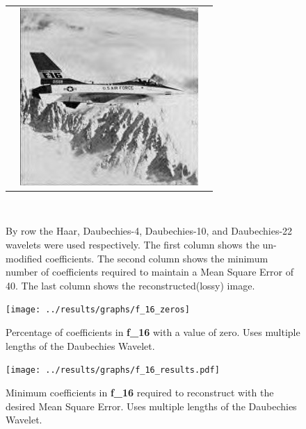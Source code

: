 \begin{figure}[hbt]
\begin{tabular}{ S @{} S @{} S }
		&	\includegraphics[height=0.25\textwidth]{../images/f_16_d22_final} \\
	\end{tabular} \\
	\caption{By row the Haar, Daubechies-4, Daubechies-10, and Daubechies-22 wavelets were used 
					 respectively. The first
					 column shows the un-modified coefficients.  The second column shows the minimum number
					 of coefficients required to maintain a Mean Square Error of 40.
					 The last column shows the reconstructed(lossy) image.}
\end{figure}


\begin{figure}[hbt]
	\centering
	\label{fig:f_16_zeros}
		\texttt{[image: ../results/graphs/f\_16\_zeros]}
	\caption{Percentage of coefficients in {\bf f\_16} with a value of zero. Uses multiple lengths of the Daubechies Wavelet. }
\end{figure}
\begin{figure}[hbt]
	\centering
	\label{fig:f_16_stats}
		\texttt{[image: ../results/graphs/f\_16\_results.pdf]}
	\caption{Minimum coefficients in {\bf f\_16} required to reconstruct with the desired Mean Square Error. Uses multiple lengths of the Daubechies Wavelet. }
\end{figure}




